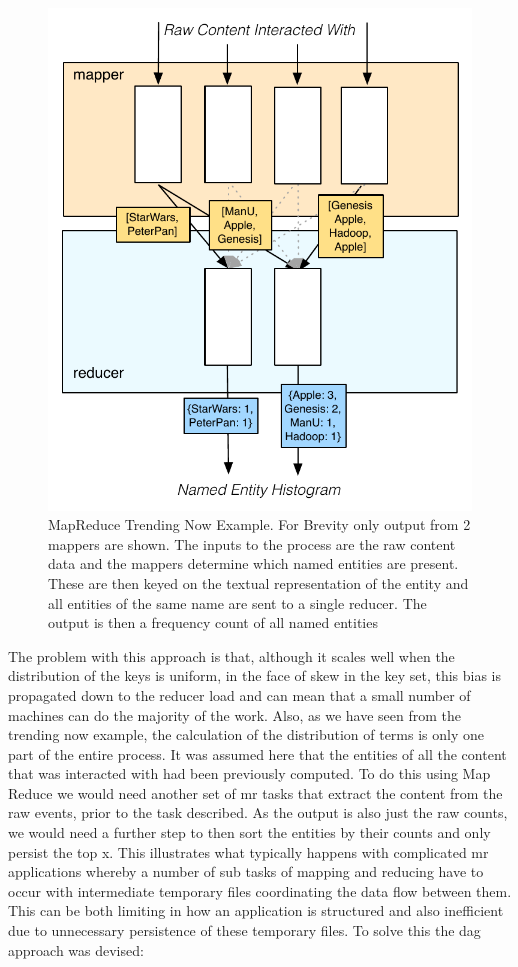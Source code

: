 \documentclass[a4paper,11pt]{scrreprt}
\begin{document}
\begin{figure}[h]
\centering
\includegraphics[scale=0.7] {MapReduceEx.pdf}
\caption{MapReduce Trending Now Example. For Brevity only output from 2 mappers are shown. The inputs to the process are the raw content data and the mappers determine which named entities are present. These are then keyed on the textual representation of the entity and all entities of the same name are sent to a single reducer. The output is then a frequency count of all named entities}
\label{fig:MapReduceEx}
\end{figure}

The problem with this approach is that, although it scales well when the distribution of the keys is uniform, in the face of skew in the key set, this bias is propagated down to the reducer load and can mean that a small number of machines can do the majority of the work. Also, as we have seen from the trending now example, the calculation of the distribution of terms is only one part of the entire process. It was assumed here that the entities of all the content that was interacted with had been previously computed. To do this using Map Reduce we would need another set of \acrshort{mr} tasks that extract the content from the raw events, prior to the task described. As the output is also just the raw counts, we would need a further step to then sort the entities by their counts and only persist the top x. This illustrates what typically happens with complicated \acrshort{mr} applications whereby a number of sub tasks of mapping and reducing have to occur with intermediate temporary files coordinating the data flow between them. This can be both limiting in how an application is structured and also inefficient due to unnecessary persistence of these temporary files. To solve this the \acrshort{dag} approach was devised:
\end{document}
